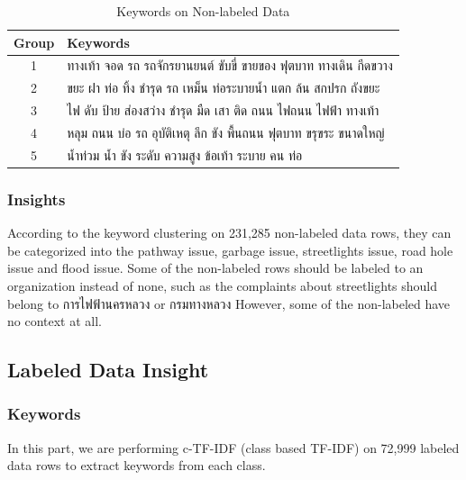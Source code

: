 \documentclass[12pt, a4paper]{article}
\begin{document}
                    \begin{table}[h]
                        \centering
                        \begin{tabular}{|c|l|}
                            \hline
                            \rule{0pt}{2.5ex}
                            \textbf{Group} & \textbf{Keywords} \\
                            \hline \hline
                            1 & ทางเท้า จอด รถ รถจักรยานยนต์ ขับขี่ ขายของ ฟุตบาท ทางเดิน กีดขวาง \\
                            2 & ขยะ ฝา ท่อ ทิ้ง ชำรุด รถ เหม็น ท่อระบายน้ำ แตก ล้น สกปรก ถังขยะ \\
                            3 & ไฟ ดับ ป้าย ส่องสว่าง ชำรุด มืด เสา ติด ถนน ไฟถนน ไฟฟ้า ทางเท้า \\
                            4 & หลุม ถนน บ่อ รถ อุบัติเหตุ ลึก ขัง พื้นถนน ฟุตบาท ขรุขระ ขนาดใหญ่ \\
                            5 & น้ำท่วม น้ำ ขัง ระดับ ความสูง ข้อเท้า ระบาย คน ท่อ \\
                            \hline
                        \end{tabular}
                        \caption{Keywords on Non-labeled Data}
                    \end{table}

                \subsubsection{Insights}
                    According to the keyword clustering on 231,285 non-labeled data rows, they can be categorized into
                    the pathway issue, garbage issue, streetlights issue, road hole issue and flood issue.
                    Some of the non-labeled rows should be labeled to an organization instead of none,
                    such as the complaints about streetlights should belong to การไฟฟ้านครหลวง or กรมทางหลวง
                    However, some of the non-labeled have no context at all.

    \pagebreak

            \subsection{Labeled Data Insight}
                \subsubsection{Keywords}
                    In this part, we are performing c-TF-IDF (class based TF-IDF) on 72,999 labeled data rows
                    to extract keywords from each class.
\end{document}
